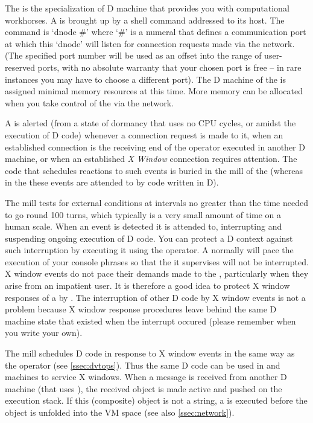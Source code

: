 The  is the specialization of D machine that provides you
with computational workhorses. A  is brought up by a
shell command addressed to its host. The command is `dnode \#' where
`\#' is a numeral that defines a communication port at which this
`dnode' will listen for connection requests made via the network. (The
specified port number will be used as an offset into the range of
user-reserved ports, with no absolute warranty that your chosen port
is free -- in rare instances you may have to choose a different
port). The D machine of the  is assigned minimal memory
resources at this time. More memory can be allocated when you take
control of the  via the network.

A  is alerted (from a state of dormancy that uses no CPU
cycles, or amidst the execution of D code) whenever a connection
request is made to it, when an established connection is the receiving
end of the  operator executed in another D machine, or when
an established \emph{X Window} connection requires attention. The code
that schedules reactions to such events is buried in the mill of the
 (whereas in the  these events are attended to
by code written in D).

The  mill tests for external conditions at intervals no
greater than the time needed to go round 100 turns, which typically is
a very small amount of time on a human scale. When an event is
detected it is attended to, interrupting and suspending ongoing
execution of D code.  You can protect a D context against such
interruption by executing it using the  operator. A
 normally will pace the execution of your console phrases
so that the  it supervises will not be
interrupted. X window events do not pace their demands made to the
, particularly when they arise from an impatient user. It
is therefore a good idea to protect X window responses of a
 by . The interruption of other D code by X
window events is not a problem because X window response procedures
leave behind the same D machine state that existed when the interrupt
occured (please remember when you write your own).

The  mill schedules D code in response to X window events
in the same way as the  operator  (see
\ref{ssec:dvtops}). Thus the same D code can be used in 
and  machines to service X windows. When a message is
received from another D machine (that uses ), the received
object is made active and pushed on the execution stack. If this
(composite) object is not a string, a  is executed before
the object is unfolded into the VM space (see also
\ref{ssec:network}).

